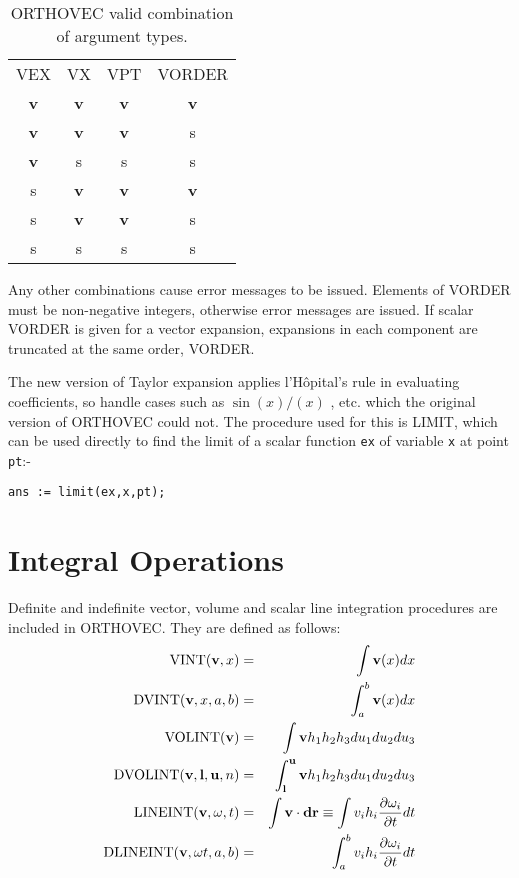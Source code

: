 \begin{table}
\begin{center}
\begin{tabular}{cccc}
VEX & VX & VPT &  VORDER \\[2ex]
{\bf v} & {\bf v} &  {\bf v} &  {\bf v}\\
{\bf v} &  {\bf v} & {\bf v} & s\\
{\bf v} & s & s & s \\
s & {\bf v} &  {\bf v} & {\bf v}   \\
s & {\bf v} & {\bf v} & s\\
s & s & s & s\\
\end{tabular}
\end{center}
\caption{ORTHOVEC valid combination of argument types.}\label{ORTHOVEC:validexp}
\end{table}

Any other combinations cause error messages to be issued.  Elements of
VORDER must be non-negative integers, otherwise error messages are
issued.  If scalar VORDER is given for a vector expansion, expansions
in each component are truncated at the same order, VORDER.

The new version of Taylor expansion applies 
l'H\^opital's rule in evaluating coefficients, so handle cases such as
$\sin(x) / (x) $ , etc.  which the original version of ORTHOVEC could
not. The procedure used for this is LIMIT,  which can
be used directly to find the limit of a scalar function {\tt ex} of
variable {\tt x} at point {\tt pt}:-

\begin{verbatim}
ans := limit(ex,x,pt);
\end{verbatim}

\section{Integral Operations}
Definite and indefinite vector, volume and scalar line integration
procedures are included in ORTHOVEC.  They are defined as follows:
 
   
\begin{eqnarray*}
{\rm VINT} ({\bf v},x) & = & \int {\bf v}(x)dx\\
%
{\rm DVINT} ({\bf v},x, a, b) & = & \int^b_a {\bf v} (x) dx\\
%
{\rm VOLINT} ({\bf v}) & = & \int {\bf v} h_1 h_2 h_3 du_1 du_2 du_3\\
%
{\rm DVOLINT}({\bf v},{\bf l},{\bf u},n) & = & \int^{\bf u}_{\bf l}
{\bf v} h_1 h_2 h_3 du_1 du_2 du_3\\
%
{\rm LINEINT} ({\bf v, \omega}, t) & = & \int {\bf v} \cdot {\bf dr}
\equiv \int v_i h_i \frac{\partial \omega_i}{\partial t} dt\\
%
{\rm DLINEINT} ({\bf v, \omega} t, a, b) & = & \int^b_a v_i h_i
\frac{\partial \omega_i}{\partial t} dt\\
\end{eqnarray*}

